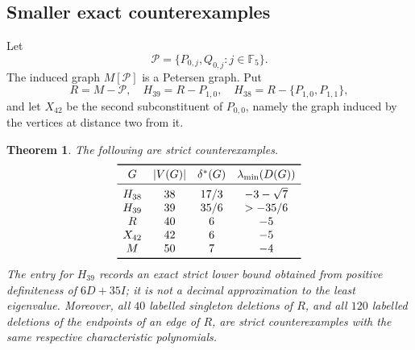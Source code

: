 \documentclass[a4paper,10pt,reqno]{amsart}
\theoremstyle{plain}
\newtheorem{theorem}{Theorem}[section]
\theoremstyle{definition}
\theoremstyle{remark}
\newcommand{\F}{\mathbb F_5}
\begin{document}
\subsection{Smaller exact counterexamples}

Let
\[
 \mathcal P=\{P_{0,j},Q_{0,j}:j\in\F\}.
\]
The induced graph \(M[\mathcal P]\) is a Petersen graph.  Put
\[
 R=M-\mathcal P,
 \quad H_{39}=R-P_{1,0},
 \quad H_{38}=R-\{P_{1,0},P_{1,1}\},
\]
and let \(X_{42}\) be the second subconstituent of \(P_{0,0}\), namely the
graph induced by the vertices at distance two from it.

\begin{theorem}\label{thm:explicit-examples}
The following are strict counterexamples.
\[
\begin{array}{c@{\quad}c@{\quad}c@{\quad}c}
\toprule
G&|V(G)|&\delta^*(G)&\lambda_{\min}(D(G))\\
\midrule
H_{38}&38&17/3&-3-\sqrt7\\
H_{39}&39&35/6&>-35/6\\
R&40&6&-5\\
X_{42}&42&6&-5\\
M&50&7&-4\\
\bottomrule
\end{array}
\]
The entry for \(H_{39}\) records an exact strict lower bound obtained from
positive definiteness of \(6D+35I\); it is not a decimal approximation to the
least eigenvalue.  Moreover, all \(40\) labelled singleton deletions of \(R\),
and all \(120\)
labelled deletions of the endpoints of an edge of \(R\), are strict
counterexamples with the same respective characteristic polynomials.
\end{theorem}
\end{document}
